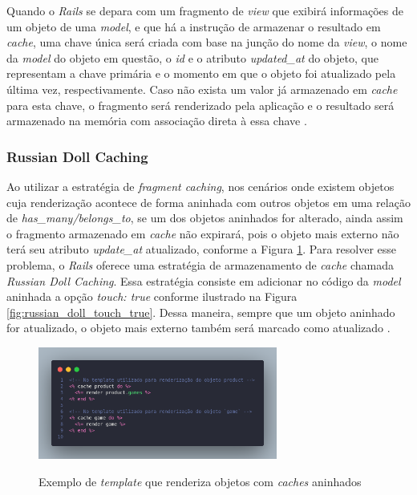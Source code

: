 Quando o \textit{Rails} se depara com um fragmento de \textit{view} que exibirá informações de um objeto de uma \textit{model}, e que há a instrução de armazenar o resultado em \textit{cache}, uma chave única será criada com base na junção do nome da \textit{view}, o nome da \textit{model} do objeto em questão, o \textit{id} e o atributo \textit{updated\_at} do objeto, que representam a chave primária e o momento em que o objeto foi atualizado pela última vez, respectivamente. Caso não exista um valor já armazenado em \textit{cache} para esta chave, o fragmento será renderizado pela aplicação e o resultado será armazenado na memória com associação direta à essa chave \cite{caching-with-rails-overview}.

\subsubsection{Russian Doll Caching}

Ao utilizar a estratégia de \textit{fragment caching}, nos cenários onde existem objetos cuja renderização acontece de forma aninhada com outros objetos em uma relação de \textit{has\_many/belongs\_to}, se um dos objetos aninhados for alterado, ainda assim o fragmento armazenado em \textit{cache} não expirará, pois o objeto mais externo não terá seu atributo \textit{update\_at} atualizado, conforme a Figura \ref{fig:russian_doll_template_example}. Para resolver esse problema, o \textit{Rails} oferece uma estratégia de armazenamento de \textit{cache} chamada \textit{Russian Doll Caching}. Essa estratégia consiste em adicionar no código da \textit{model} aninhada a opção \textit{touch: true} conforme ilustrado na Figura \ref{fig:russian_doll_touch_true}. Dessa maneira, sempre que um objeto aninhado for atualizado, o objeto mais externo também será marcado como atualizado \cite{caching-with-rails-overview}.

\begin{figure}
    \centering
    \caption{Exemplo de \textit{template} que renderiza objetos com \textit{caches} aninhados}
    \includegraphics[width=0.7\textwidth]{figuras/russian_doll_template_example.png}
    \label{fig:russian_doll_template_example}
\end{figure}


